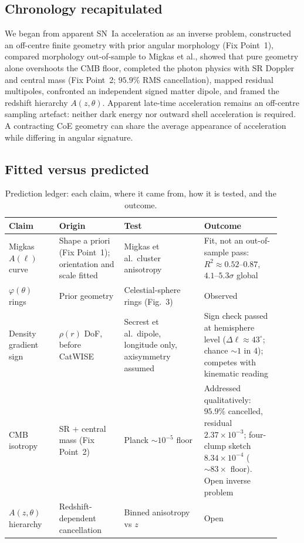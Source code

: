 \documentclass[11pt,a4paper]{article}
\begin{document}
\subsection{Chronology recapitulated}

We began from apparent SN~Ia acceleration as an inverse problem, constructed an off-centre finite geometry with prior angular morphology (Fix Point~1), compared morphology out-of-sample to Migkas et al., showed that pure geometry alone overshoots the CMB floor, completed the photon physics with SR Doppler and central mass (Fix Point~2; \(95.9\%\) RMS cancellation), mapped residual multipoles, confronted an independent signed matter dipole, and framed the redshift hierarchy \(A(z,\theta)\). Apparent late-time acceleration remains an off-centre sampling artefact: neither dark energy nor outward shell acceleration is required. A contracting CoE geometry can share the average appearance of acceleration while differing in angular signature.

\subsection{Fitted versus predicted}

\FloatBarrier
\begin{table}[t]
\centering
\caption{Prediction ledger: each claim, where it came from, how it is tested, and the outcome.}
\label{tab:ledger}
\small
\begin{tabular}{@{}>{\raggedright\arraybackslash}p{0.17\linewidth}>{\raggedright\arraybackslash}p{0.22\linewidth}>{\raggedright\arraybackslash}p{0.27\linewidth}>{\raggedright\arraybackslash}p{0.26\linewidth}@{}}
\toprule
Claim & Origin & Test & Outcome \\
\midrule
Migkas \(A(\ell)\) curve & Shape a priori (Fix Point~1); orientation and scale fitted & Migkas et al.\ cluster anisotropy & Fit, not an out-of-sample pass: \(R^{2}\approx0.52\)--\(0.87\), \(4.1\)--\(5.3\sigma\) global \\
\(\varphi(\theta)\) rings & Prior geometry & Celestial-sphere rings (Fig.~3) & Observed \\
Density gradient sign & \(\rho(r)\) DoF, before CatWISE & Secrest et al.\ dipole, longitude only, axisymmetry assumed & Sign check passed at hemisphere level (\(\Delta\ell\approx43^\circ\); chance \(\sim1\) in \(4\)); competes with kinematic reading \\
CMB isotropy & SR + central mass (Fix Point~2) & Planck \(\sim10^{-5}\) floor & Addressed qualitatively: \(95.9\%\) cancelled, residual \(2.37\times10^{-3}\); four-clump sketch \(8.34\times10^{-4}\) (\(\sim83\times\) floor). Open inverse problem \\
\(A(z,\theta)\) hierarchy & Redshift-dependent cancellation & Binned anisotropy vs \(z\) & Open \\
\bottomrule
\end{tabular}
\end{table}
\end{document}
